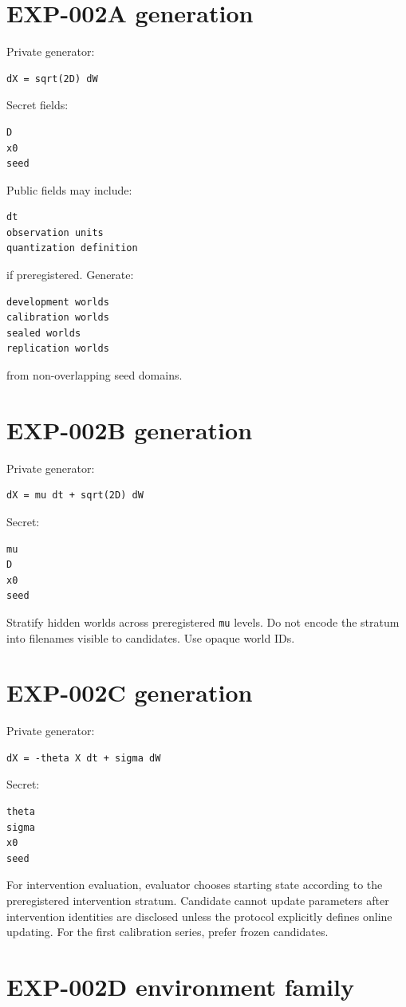 \documentclass[11pt]{article}
\begin{document}
\section{EXP-002A generation}

Private generator:
\begin{verbatim}
dX = sqrt(2D) dW
\end{verbatim}
Secret fields:
\begin{verbatim}
D
x0
seed
\end{verbatim}
Public fields may include:
\begin{verbatim}
dt
observation units
quantization definition
\end{verbatim}
if preregistered. Generate:
\begin{verbatim}
development worlds
calibration worlds
sealed worlds
replication worlds
\end{verbatim}
from non-overlapping seed domains.

\section{EXP-002B generation}

Private generator:
\begin{verbatim}
dX = mu dt + sqrt(2D) dW
\end{verbatim}
Secret:
\begin{verbatim}
mu
D
x0
seed
\end{verbatim}
Stratify hidden worlds across preregistered \texttt{mu} levels. Do not encode the stratum into filenames visible to candidates. Use opaque world IDs.

\section{EXP-002C generation}

Private generator:
\begin{verbatim}
dX = -theta X dt + sigma dW
\end{verbatim}
Secret:
\begin{verbatim}
theta
sigma
x0
seed
\end{verbatim}
For intervention evaluation, evaluator chooses starting state according to the preregistered intervention stratum. Candidate cannot update parameters after intervention identities are disclosed unless the protocol explicitly defines online updating. For the first calibration series, prefer frozen candidates.

\section{EXP-002D environment family}
\end{document}
